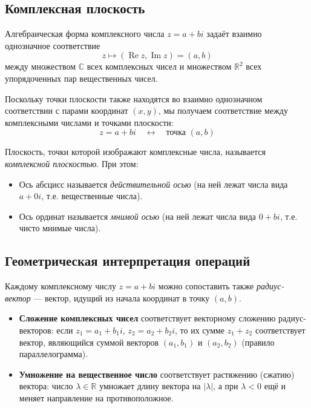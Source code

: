 \documentclass[a4paper,12pt]{article}
\theoremstyle{definition}
\theoremstyle{plain}
\theoremstyle{remark}
\begin{document}
	\subsection{Комплексная плоскость}
	
	\noindent Алгебраическая форма комплексного числа $z = a + bi$ задаёт взаимно однозначное соответствие
	\[
	z \mapsto (\operatorname{Re} z, \operatorname{Im} z) = (a, b)
	\]
	между множеством $\mathbb{C}$ всех комплексных чисел и множеством $\mathbb{R}^2$ всех упорядоченных пар вещественных чисел.
	
	Поскольку точки плоскости также находятся во взаимно однозначном соответствии с парами координат $(x, y)$, мы получаем соответствие между комплексными числами и точками плоскости:
	\[
	z = a + bi \quad \longleftrightarrow \quad \text{точка } (a, b)
	\]
	
	\begin{tcolorbox}[colback=blue!5, colframe=blue!40!black, title=Комплексная плоскость]
		Плоскость, точки которой изображают комплексные числа, называется \textit{комплексной плоскостью}. При этом:
		\begin{itemize}
			\item Ось абсцисс называется \textit{действительной осью} (на ней лежат числа вида $a + 0i$, т.е. вещественные числа).
			\item Ось ординат называется \textit{мнимой осью} (на ней лежат числа вида $0 + bi$, т.е. чисто мнимые числа).
		\end{itemize}
	\end{tcolorbox}
	
	\subsection{Геометрическая интерпретация операций}
	
	\noindent Каждому комплексному числу $z = a + bi$ можно сопоставить также \textit{радиус-вектор} — вектор, идущий из начала координат в точку $(a, b)$.
	
	\begin{itemize}
		\item \textbf{Сложение комплексных чисел} соответствует векторному сложению радиус-векторов: если $z_1 = a_1 + b_1i$, $z_2 = a_2 + b_2i$, то их сумме $z_1 + z_2$ соответствует вектор, являющийся суммой векторов $(a_1, b_1)$ и $(a_2, b_2)$ (правило параллелограмма).
		
		\item \textbf{Умножение на вещественное число} соответствует растяжению (сжатию) вектора: число $\lambda \in \mathbb{R}$ умножает длину вектора на $|\lambda|$, а при $\lambda < 0$ ещё и меняет направление на противоположное.
	\end{itemize}
	
\end{document}
